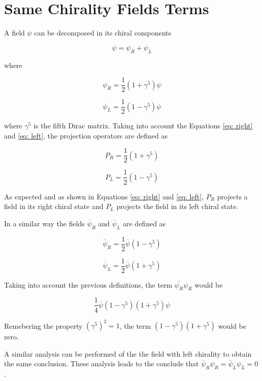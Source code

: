 \chapter{Same Chirality Fields Terms} \label{app: samechirality}

A field $\psi$ can be decomposed in its chiral components

$$ \psi = \psi_{R} + \psi_{L} $$

where 

\begin{equation}\label{eq: right}
\psi_{R} = \frac{1}{2}\left(1 + \gamma^{5}\right)\psi
\end{equation}

\begin{equation}\label{eq: left}
\psi_{L} = \frac{1}{2}\left(1 - \gamma^{5}\right)\psi
\end{equation}

where $\gamma^{5}$ is the fifth Dirac matrix. Taking into account the Equations \ref{eq: right} and \ref{eq: left}, the projection operators are defined as

$$P_{R} = \frac{1}{2}\left(1 + \gamma^{5}\right)$$

$$P_{L} = \frac{1}{2}\left(1 - \gamma^{5}\right)$$

As expected and as shown in Equations \ref{eq: right} and \ref{eq: left}, $P_{R}$ projects a field in its right chiral state and $P_{L}$ projects the field in its left chiral state.


In a similar way the fields $\overline{\psi}_{R}$ and $\overline{\psi}_{L}$ are defined as  

$$ \overline{\psi}_{R} = \frac{1}{2}\overline{\psi}\left(1 - \gamma^{5}\right) $$

$$ \overline{\psi}_{L} = \frac{1}{2}\overline{\psi}\left(1 + \gamma^{5}\right) $$

Taking into account the previous definitions, the term $\bar{\psi_{R}}\psi_{R}$ would be

$$\frac{1}{4}\overline{\psi}\left(1 - \gamma^{5}\right)\left(1+\gamma^{5}\right)\psi$$

Remebering the property $\left(\gamma^{5}\right)^{2} = 1$, the term $\left(1 - \gamma^{5}\right)\left(1+\gamma^{5}\right)$ would be zero.

A similar analysis can be performed of the the field with left chirality to obtain the same conclusion. These analysis leads to the conclude that $\overline{\psi}_{R}\psi_{R} = \overline{\psi}_{L}\psi_{L} = 0$. 



